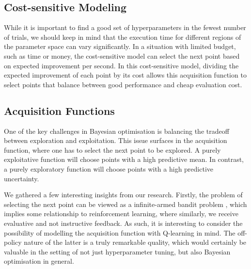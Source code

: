 \documentclass[letterpaper]{article}
\begin{document}
\subsection{Cost-sensitive Modeling}
While it is important to find a good set of hyperparameters in the fewest number of
trials, we should keep in mind that the execution time for different regions of the
parameter space can vary significantly. In a situation with limited budget, such as
time or money, the cost-sensitive model can select the next point based on expected
improvement per second. In this cost-sensitive model, dividing the expected improvement
of each point by its cost allows this acquisition function to select points that
balance between good performance and cheap evaluation cost.

\subsection{Acquisition Functions}
One of the key challenges in Bayesian optimisation is balancing the tradeoff
between exploration and exploitation. This issue surfaces in the acquisition function,
where one has to select the next point to be explored. A purely exploitative function
will choose points with a high predictive mean. In contrast, a purely exploratory
function will choose points with a high predictive uncertainty.

We gathered a few interesting insights from our research.
Firstly, the problem of selecting the next point can be viewed as a infinite-armed
bandit problem \cite{hoffman2011portfolio}, which implies some relationship to
reinforcement learning, where similarly, we receive evaluative and not instructive
feedback. As such, it is interesting to consider the possibility of modelling the
acquisition function with Q-learning in mind. The off-policy nature of the latter is
a truly remarkable quality, which would certainly be valuable in the setting of not
just hyperparameter tuning, but also Bayesian optimisation in general.
\end{document}
